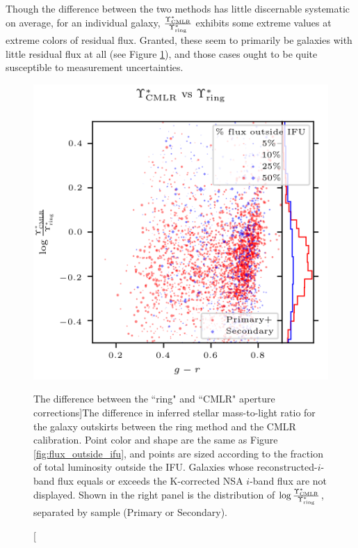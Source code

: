 Though the difference between the two methods has little discernable systematic on average, for an individual galaxy, $\frac{\Upsilon^*_{\rm CMLR}}{\Upsilon^*_{\rm ring}}$ exhibits some extreme values at extreme colors of residual flux. Granted, these seem to primarily be galaxies with little residual flux at all (see Figure \ref{fig:outer_ml}), and those cases ought to be quite susceptible to measurement uncertainties.

\begin{figure}
    \centering
    \includegraphics[width=\columnwidth]{outer_ml}
    \caption[The difference between the ``ring" and ``CMLR" aperture corrections]{\fixspacing The difference in inferred stellar mass-to-light ratio for the galaxy outskirts between the ring method and the CMLR calibration. Point color and shape are the same as Figure \ref{fig:flux_outside_ifu}, and points are sized according to the fraction of total luminosity outside the IFU. Galaxies whose reconstructed-$i$-band flux equals or exceeds the K-corrected NSA $i$-band flux are not displayed. Shown in the right panel is the distribution of $\log \frac{\Upsilon^*_{\rm CMLR}}{\Upsilon^*_{\rm ring}}$, separated by sample (Primary or Secondary).}
    \label{fig:outer_ml}
\end{figure}

